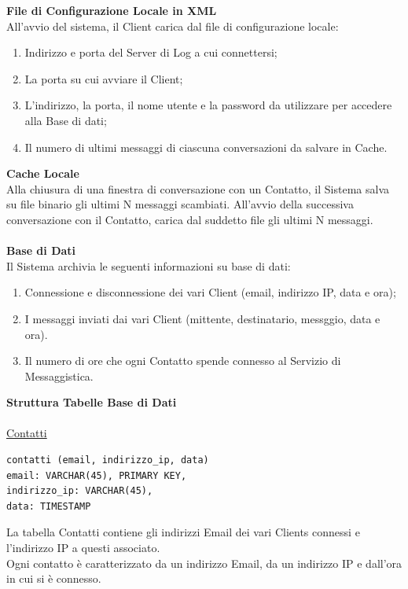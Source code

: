 \documentclass[a4paper, 11pt]{article} %
\begin{document}
\vspace{0.5cm}
\textbf{File di Configurazione Locale in XML}\\
All'avvio del sistema, il Client carica dal file di configurazione locale:
\begin{enumerate}
\item Indirizzo e porta del Server di Log a cui connettersi;
\item La porta su cui avviare il Client;
\item L'indirizzo, la porta, il nome utente e la password da utilizzare per accedere alla Base di dati;
\item Il numero di ultimi messaggi di ciascuna conversazioni da salvare in Cache.
\end{enumerate}
\vspace{0.5cm}
\textbf{Cache Locale}\\
Alla chiusura di una finestra di conversazione con un Contatto, il Sistema salva su file binario gli ultimi N messaggi scambiati. All'avvio della successiva conversazione con il Contatto, carica dal suddetto file gli ultimi N messaggi.\\
\\
\textbf{Base di Dati}\\
Il Sistema archivia le seguenti informazioni su base di dati:
\begin{enumerate}
\item Connessione e disconnessione dei vari Client (email, indirizzo IP, data e ora);
\item I messaggi inviati dai vari Client (mittente, destinatario, messggio, data e ora).
\item Il numero di ore che ogni Contatto spende connesso al Servizio di Messaggistica.
\end{enumerate}
\vspace{0.5cm}
\textbf{Struttura Tabelle Base di Dati}\\
\\
\underline{Contatti}
\lstset{language=sql}
\begin{lstlisting}[frame=single]
contatti (email, indirizzo_ip, data)
email: VARCHAR(45), PRIMARY KEY,
indirizzo_ip: VARCHAR(45),
data: TIMESTAMP
\end{lstlisting}
La tabella Contatti contiene gli indirizzi Email dei vari Clients connessi e l'indirizzo IP a questi associato.\\
Ogni contatto \`e caratterizzato da un indirizzo Email, da un indirizzo IP e dall'ora in cui si \`e connesso.\\
\end{document}

